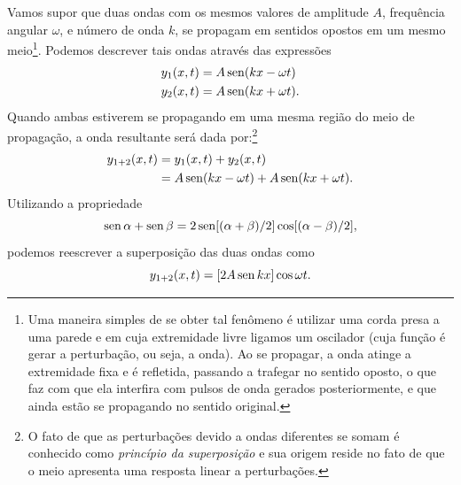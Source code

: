 Vamos supor que duas ondas com os mesmos valores de amplitude $A$, frequência angular $\omega$, e número de onda $k$, se propagam em sentidos opostos em um mesmo meio\footnote[][-1cm]{Uma maneira simples de se obter tal fenômeno é utilizar uma corda presa a uma parede e em cuja extremidade livre ligamos um oscilador (cuja função é gerar a perturbação, ou seja, a onda). Ao se propagar, a onda atinge a extremidade fixa e é refletida, passando a trafegar no sentido oposto, o que faz com que ela interfira com pulsos de onda gerados posteriormente, e que ainda estão se propagando no sentido original.}. Podemos descrever tais ondas através das expressões
\begin{align}
	y_1(x,t) &= A \operatorname{sen}(kx - \omega t) \\
	y_2(x,t) &= A \operatorname{sen}(kx + \omega t).
\end{align}
%
Quando ambas estiverem se propagando em uma mesma região do meio de propagação, a onda resultante será dada por:\footnote[][2cm]{O fato de que as perturbações devido a ondas diferentes se somam é conhecido como \emph{princípio da superposição} e sua origem reside no fato de que o meio apresenta uma resposta linear a perturbações.}
\begin{align}
	y_{1+2}(x,t) &= y_1(x,t) + y_2(x,t)\\
	&= A \operatorname{sen}(kx -\omega t) + A \operatorname{sen}(kx + \omega t).
\end{align}
%
Utilizando a propriedade
\begin{equation}
	\operatorname{sen} \alpha + \operatorname{sen} \beta = 2 \operatorname{sen}[(\alpha + \beta)/2]\cos[(\alpha-\beta)/2],
\end{equation}
podemos reescrever a superposição das duas ondas como
\begin{equation}\label{Eq:EqOndaEstacionaria}
	y_{1+2}(x,t)=[2A\operatorname{sen} kx]\cos\omega t.
\end{equation}

